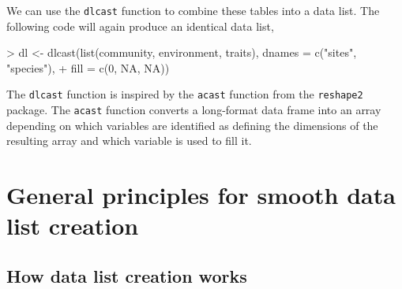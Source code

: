 \documentclass{article}
\newcommand{\code}[1]{\texttt{#1}}
\numberwithin{exercise}{section}
\begin{document}
We can use the \code{dlcast} function to combine these tables into a data list.  The following code will again produce an identical data list,
\begin{Schunk}
\begin{Sinput}
> dl <- dlcast(list(community, environment, traits), dnames = c("sites", "species"), 
+     fill = c(0, NA, NA))
\end{Sinput}
\end{Schunk}
The \code{dlcast} function is inspired by the \code{acast} function from the \code{reshape2} package.  The \code{acast} function converts a long-format data frame into an array depending on which variables are identified as defining the dimensions of the resulting array and which variable is used to fill it.  

\section{General principles for smooth data list creation}

\subsection{How data list creation works}
\end{document}
